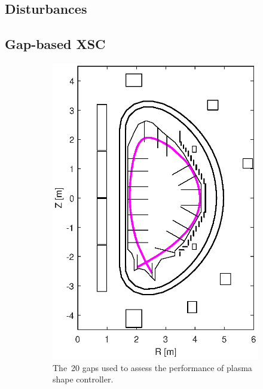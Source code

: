 \subsection{Disturbances}


\subsection{Gap-based XSC}



\begin{figure}
	\centering
	\begin{subfigure}[b]{0.32\textwidth}
		\includegraphics[width=\textwidth] {Chp3/20_gaps.eps}  
		\caption{The~20 gaps used to assess the performance of plasma shape controller.	\label{figure:20_gaps} }
	\end{subfigure}
	~
	\begin{subfigure}[b]{0.32\textwidth}

\end{subfigure}
\end{figure}
